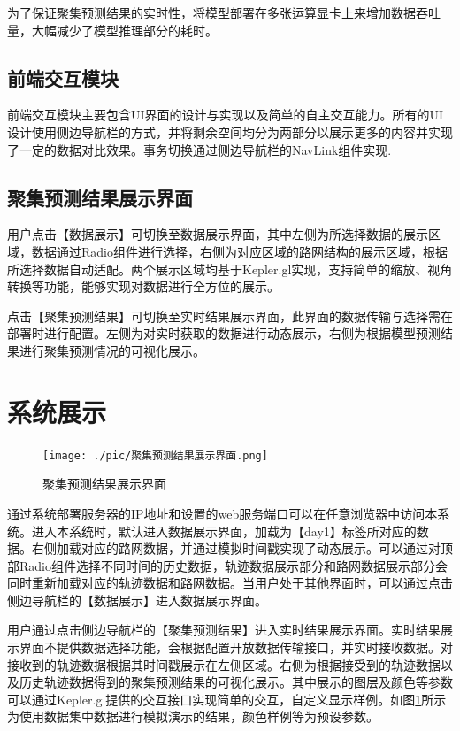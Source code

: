 \documentclass[master]{thesis-uestc}
\begin{document}
为了保证聚集预测结果的实时性，将模型部署在多张运算显卡上来增加数据吞吐量，大幅减少了模型推理部分的耗时。

\subsection{前端交互模块}
前端交互模块主要包含UI界面的设计与实现以及简单的自主交互能力。所有的UI设计使用侧边导航栏的方式，并将剩余空间均分为两部分以展示更多的内容并实现了一定的数据对比效果。事务切换通过侧边导航栏的NavLink组件实现.

\subsection{聚集预测结果展示界面}
用户点击【数据展示】可切换至数据展示界面，其中左侧为所选择数据的展示区域，数据通过Radio组件进行选择，右侧为对应区域的路网结构的展示区域，根据所选择数据自动适配。两个展示区域均基于Kepler.gl实现，支持简单的缩放、视角转换等功能，能够实现对数据进行全方位的展示。

点击【聚集预测结果】可切换至实时结果展示界面，此界面的数据传输与选择需在部署时进行配置。左侧为对实时获取的数据进行动态展示，右侧为根据模型预测结果进行聚集预测情况的可视化展示。

\section{系统展示}

\begin{figure}[!ht]
\centering
\texttt{[image: ./pic/聚集预测结果展示界面.png]}
\caption{聚集预测结果展示界面}
\label{Figure.5.8}
\end{figure}

通过系统部署服务器的IP地址和设置的web服务端口可以在任意浏览器中访问本系统。进入本系统时，默认进入数据展示界面，加载为【day1】标签所对应的数据。右侧加载对应的路网数据，并通过模拟时间戳实现了动态展示。可以通过对顶部Radio组件选择不同时间的历史数据，轨迹数据展示部分和路网数据展示部分会同时重新加载对应的轨迹数据和路网数据。当用户处于其他界面时，可以通过点击侧边导航栏的【数据展示】进入数据展示界面。

用户通过点击侧边导航栏的【聚集预测结果】进入实时结果展示界面。实时结果展示界面不提供数据选择功能，会根据配置开放数据传输接口，并实时接收数据。对接收到的轨迹数据根据其时间戳展示在左侧区域。右侧为根据接受到的轨迹数据以及历史轨迹数据得到的聚集预测结果的可视化展示。其中展示的图层及颜色等参数可以通过Kepler.gl提供的交互接口实现简单的交互，自定义显示样例。如图\ref{Figure.5.8}所示为使用数据集中数据进行模拟演示的结果，颜色样例等为预设参数。
\end{document}
